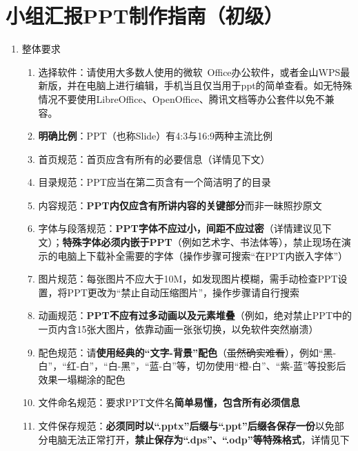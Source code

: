 \section[小组汇报PPT制作指南（初级）]{小组汇报PPT制作指南（初级）}
\begin{enumerate}
      \item 整体要求
            \begin{enumerate}
                  \item 选择软件：请使用大多数人使用的微软\ Office办公软件，或者金山WPS最新版，并在电脑上进行编辑，手机当且仅当用于ppt的简单查看。如无特殊情况不要使用LibreOffice、OpenOffice、腾讯文档等办公套件以免不兼容。
                  \item \textbf{明确比例}：PPT（也称Slide）有4:3与16:9两种主流比例\footnotemark
                  \item 首页规范：首页应含有所有的必要信息（详情见下文）
                  \item 目录规范：PPT应当在第二页含有一个简洁明了的目录
                  \item 内容规范：\textbf{PPT内仅应含有所讲内容的关键部分}而非一昧照抄原文
                  \item 字体与段落规范：\textbf{PPT字体不应过小，间距不应过密}（详情建议见下文）；\textbf{特殊字体必须内嵌于PPT}（例如艺术字、书法体等），禁止现场在演示的电脑上下载补全需要的字体（操作步骤可搜索“在PPT内嵌入字体”）
                  \item 图片规范：每张图片不应大于10M，如发现图片模糊，需手动检查PPT设置，将PPT更改为“禁止自动压缩图片”，操作步骤请自行搜索
                  \item 动画规范：\textbf{PPT不应有过多动画以及元素堆叠}（例如，绝对禁止PPT中的一页内含15张大图片，依靠动画一张张切换，以免软件突然崩溃）
                  \item 配色规范：请\textbf{使用经典的“文字-背景”配色}（\sout{虽然确实难看}），例如“黑-白”，“红-白”，\linebreak[3]“白-黑”，“蓝-白”等，切勿使用“橙-白”、“紫-蓝”等投影后效果一塌糊涂的配色\footnotemark
                  \item 文件命名规范：要求PPT文件名\textbf{简单易懂，包含所有必须信息}
                  \item 文件保存规范\footnotemark：\textbf{必须同时以“.pptx”后缀与“.ppt”后缀各保存一份}以免部分电脑无法正常打开，\textbf{禁止保存为“.dps”、“.odp”等特殊格式}，详情见下

\end{enumerate}
\end{enumerate}
